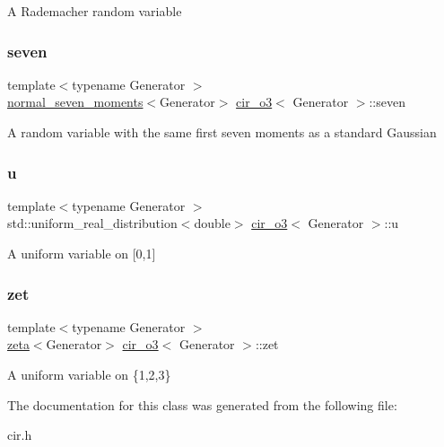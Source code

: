 A Rademacher random variable \mbox{\label{classcir__o3_a22d7ad16bc9bfb168095ab16ff0bc685}} 
\subsubsection{\texorpdfstring{seven}{seven}}
{\footnotesize\ttfamily template$<$typename Generator $>$ \\
\mbox{\hyperlink{classnormal__seven__moments}{normal\+\_\+seven\+\_\+moments}}$<$Generator$>$ \mbox{\hyperlink{classcir__o3}{cir\+\_\+o3}}$<$ Generator $>$\+::seven\hspace{0.3cm}{\ttfamily [protected]}}

A random variable with the same first seven moments as a standard Gaussian \mbox{\label{classcir__o3_a0e08c2c516a7f821a4a3ee8f9b0cf162}} 
\subsubsection{\texorpdfstring{u}{u}}
{\footnotesize\ttfamily template$<$typename Generator $>$ \\
std\+::uniform\+\_\+real\+\_\+distribution$<$double$>$ \mbox{\hyperlink{classcir__o3}{cir\+\_\+o3}}$<$ Generator $>$\+::u\hspace{0.3cm}{\ttfamily [protected]}}

A uniform variable on \mbox{[}0,1\mbox{]} \mbox{\label{classcir__o3_aff6081fa06fbab8fd8bf06bbef2bf7c4}} 
\subsubsection{\texorpdfstring{zet}{zet}}
{\footnotesize\ttfamily template$<$typename Generator $>$ \\
\mbox{\hyperlink{classzeta}{zeta}}$<$Generator$>$ \mbox{\hyperlink{classcir__o3}{cir\+\_\+o3}}$<$ Generator $>$\+::zet\hspace{0.3cm}{\ttfamily [protected]}}

A uniform variable on \{1,2,3\} 

The documentation for this class was generated from the following file\+:\begin{DoxyCompactItemize}
\item 
cir.\+h\end{DoxyCompactItemize}
